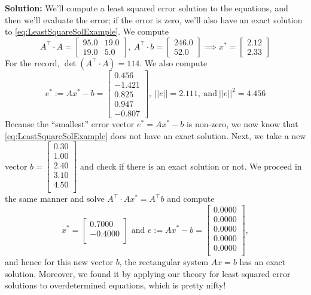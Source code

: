 \textbf{Solution:} 
We'll compute a least squared error solution to the equations, and then we'll evaluate the error; if the error is zero, we'll also have an exact solution to \eqref{eq:LeastSquareSolExample}. We compute 
$$A^\top \cdot A = \left[\begin{array}{rr} 
95.0 & 19.0 \\
19.0  &  5.0 \end{array}\right],~
A^\top \cdot b = \left[\begin{array}{r} 
246.0\\
  52.0 
  \end{array}\right] \implies x^\ast= 
  \left[\begin{array}{r} 
  2.12 \\
 2.33 
 \end{array}\right]$$
For the record, $\det(A^\top \cdot A)=114.$ We also compute
$$e^\ast:=Ax^\ast-b = \left[\begin{array}{r}
0.456\\
 -1.421\\
  0.825 \\
  0.947\\
 -0.807 
 \end{array}\right], ~||e||=2.111,~\text{and}~ ||e||^2 = 4.456 $$
 Because the ``smallest'' error vector $e^\ast=Ax^\ast-b$ is non-zero, we now know that \eqref{eq:LeastSquareSolExample} does not have an exact solution. 
 Next, we take a new vector $b=\left[
\begin{array}{c}
0.30 \\
1.00 \\
2.40 \\
3.10\\
4.50 \\
\end{array}
\right]$ and check if there is an exact solution or not. We proceed in the same manner and solve $A^\top \cdot A x^\ast =A^\top b$ and compute 
$$ x^\ast = \left[
\begin{array}{r}
0.7000 \\
-0.4000 \\
\end{array}
\right] \text{ and } e:= A x^\ast - b = \left[
\begin{array}{c}
0.0000 \\
0.0000 \\
0.0000 \\
0.0000 \\
0.0000 \\
\end{array}
\right],$$
and hence for this new vector $b$, the rectangular system $Ax = b$ has an exact solution. Moreover, we found it by applying our theory for least squared error solutions to overdetermined equations, which is pretty nifty!
  \Qed\\
  
